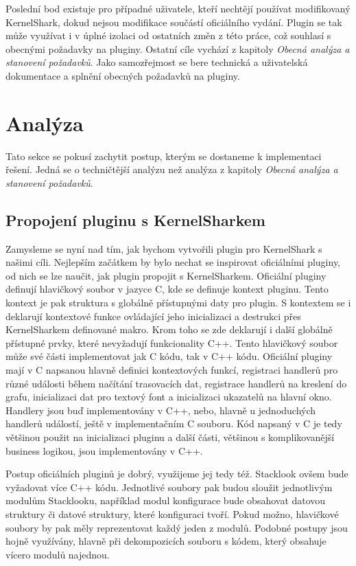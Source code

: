 Poslední bod existuje pro případné uživatele, kteří nechtějí používat modifikovaný KernelShark, dokud nejsou modifikace součástí oficiálního vydání. Plugin se tak může využívat i v úplné izolaci od ostatních změn z této práce, což souhlasí s obecnými požadavky na pluginy. Ostatní cíle vychází z kapitoly \emph{Obecná analýza a stanovení požadavků}. Jako samozřejmost se bere technická a uživatelská dokumentace a splnění obecných požadavků na pluginy.

\section{Analýza}
Tato sekce se pokusí zachytit postup, kterým se dostaneme k implementaci řešení. Jedná se o techničtější analýzu než analýza z kapitoly \emph{Obecná analýza a stanovení požadavků}.

\subsection{Propojení pluginu s KernelSharkem}
Zamysleme se nyní nad tím, jak bychom vytvořili plugin pro KernelShark s našimi cíli. Nejlepším začátkem by bylo nechat se inspirovat oficiálními pluginy, od nich se lze naučit, jak plugin propojit s KernelSharkem. Oficiální pluginy definují hlavičkový soubor v jazyce C, kde se definuje kontext pluginu. Tento kontext je pak struktura s globálně přístupnými daty pro plugin. S kontextem se i deklarují kontextové funkce ovládající jeho inicializaci a destrukci přes KernelSharkem definované makro. Krom toho se zde deklarují i další globálně přístupné prvky, které nevyžadují funkcionality C++. Tento hlavičkový soubor může své části implementovat jak C kódu, tak v C++ kódu. Oficiální pluginy mají v C napsanou hlavně definici kontextových funkcí, registraci handlerů pro různé události během načítání trasovacích dat, registrace handlerů na kreslení do grafu, inicializaci dat pro textový font a inicializaci ukazatelů na hlavní okno. Handlery jsou buď implementovány v C++, nebo, hlavně u jednoduchých handlerů událostí, ještě v implementačním C souboru. Kód napsaný v C je tedy většinou použit na inicializaci pluginu a další části, většinou s komplikovanější business logikou, jsou implementovány v C++.

Postup oficiálních pluginů je dobrý, využijeme jej tedy též. Stacklook ovšem bude vyžadovat více C++ kódu. Jednotlivé soubory pak budou sloužit jednotlivým modulům Stacklooku, například modul konfigurace bude obsahovat datovou struktury či datové struktury, které konfiguraci tvoří. Pokud možno, hlavičkové soubory by pak měly reprezentovat každý jeden z modulů. Podobné postupy jsou hojně využívány, hlavně při dekompozicích souboru s kódem, který obsahuje vícero modulů najednou.

